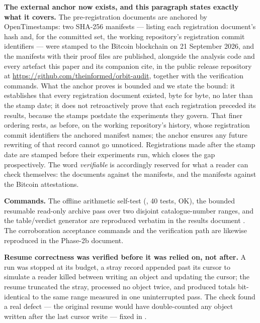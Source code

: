 \documentclass[11pt]{article}
\begin{document}
\textbf{The external anchor now exists, and this paragraph states exactly what it covers.} The pre-registration documents are anchored by OpenTimestamps: two SHA-256 manifests --- listing each registration document's hash and, for the committed set, the working repository's registration commit identifiers --- were stamped to the Bitcoin blockchain on 21 September 2026, and the manifests with their proof files are published, alongside the analysis code and every artefact this paper and its companion cite, in the public release repository at \url{https://github.com/theinformed/orbit-audit}, together with the verification commands. What the anchor proves is bounded and we state the bound: it establishes that every registration document existed, byte for byte, no later than the stamp date; it does not retroactively prove that each registration preceded its results, because the stamps postdate the experiments they govern. That finer ordering rests, as before, on the working repository's history, whose registration commit identifiers the anchored manifest names; the anchor ensures any future rewriting of that record cannot go unnoticed. Registrations made after the stamp date are stamped before their experiments run, which closes the gap prospectively. The word \emph{verifiable} is accordingly reserved for what a reader can check themselves: the documents against the manifests, and the manifests against the Bitcoin attestations.

\textbf{Commands.} The offline arithmetic self-test (, 40 tests, OK), the bounded resumable read-only archive pass over two disjoint catalogue-number ranges, and the table/verdict generator are reproduced verbatim in the results document%
. The corroboration acceptance commands and the verification path are likewise reproduced in the Phase-2b document.

\textbf{Resume correctness was verified before it was relied on, not after.} A run was stopped at its budget, a stray record appended past its cursor to simulate a reader killed between writing an object and updating the cursor; the resume truncated the stray, processed no object twice, and produced totals bit-identical to the same range measured in one uninterrupted pass. The check found a real defect --- the original resume would have double-counted any object written after the last cursor write --- fixed in %
.
\end{document}
